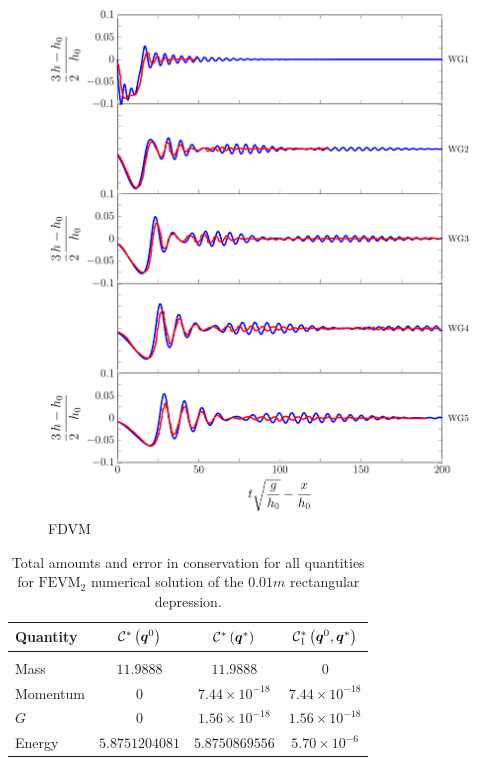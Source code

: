 \begin{figure}
	\centering
	\includegraphics[width=\textwidth]{./chp6/figures/Experiment/Segur/LongWGsFDVM1cm.pdf}
	\caption{FDVM}
	\label{fig:Segur1cmFDVM}
\end{figure} 

\begin{table}
	\centering
	\begin{tabular}{l  c  c c}
		Quantity& $\mathcal{C}^*\left(\boldsymbol{q}^0\right)$ & $\mathcal{C}^*\left(\boldsymbol{q}^*\right)$ & $\mathcal{C}^*_1\left(\boldsymbol{q}^0,\boldsymbol{q}^*\right)$ \\
		\hline &&& \\
		Mass & $11.9888$ & $11.9888$ & $0$\\
		Momentum & $0$ & $7.44 \times 10^{-18}$ & $7.44 \times 10^{-18}$\\
		$G$ & $0$ & $1.56\times 10^{-18}$ & $1.56\times 10^{-18}$\\
		Energy & $5.8751204081$ & $5.8750869556$ & $5.70 \times 10^{-6}$ \\
	\end{tabular}
	\caption{Total amounts and error in conservation for all quantities for $\text{FEVM}_2$ numerical solution of the $0.01m$ rectangular depression.}
	\label{tab:ConservationSegurFEVM1cm}
\end{table} 



